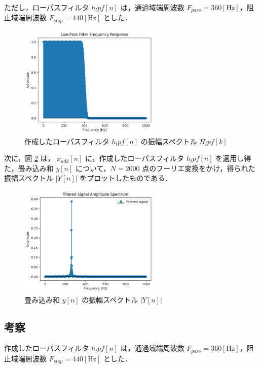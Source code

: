 \documentclass[fleqn, a4paper. 12pt]{jsarticle}
\begin{document}
  ただし，ローパスフィルタ $h_lpf[n]$ は，通過域端周波数 $F_{pass} = 360 [\mathrm{Hz}]$，阻止域端周波数 $F_{stop} = 440 [\mathrm{Hz}]$ とした．

  \begin{figure}[!h]
    \centering
    \includegraphics[width=0.6\textwidth]{fig_25.png}
    \caption{作成したローパスフィルタ $h_lpf[n]$ の振幅スペクトル $H_lpf[k]$}
    \label{fig:fig5}
  \end{figure}

  次に，図 \ref{fig:fig6} は， $x_{add}[n]$ に，作成したローパスフィルタ $h_lpf[n]$ を適用し得た，畳み込み和 $y[n]$ について，$N = 2000$ 点のフーリエ変換をかけ，得られた振幅スペクトル $|Y[n]|$ をプロットしたものである．

  \begin{figure}[!h]
    \centering
    \includegraphics[width=0.6\textwidth]{fig_26.png}
    \caption{畳み込み和 $y[n]$ の振幅スペクトル $|Y[n]|$}
    \label{fig:fig6}
  \end{figure}

  \subsection*{考察}

    作成したローパスフィルタ $h_lpf[n]$ は，通過域端周波数 $F_{pass} = 360 [\mathrm{Hz}]$，阻止域端周波数 $F_{stop} = 440 [\mathrm{Hz}]$ とした．
\end{document}
